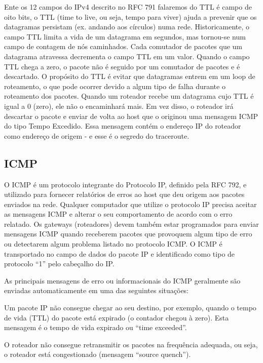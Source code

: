 \documentclass[article,12pt,oneside,a4paper,english,brazil,sumario=tradicional]{abntex2}
\begin{document}
Ente os 12 campos do IPv4 descrito no RFC 791 falaremos do TTL é campo de oito bits, o TTL (time to live, ou seja, tempo para viver) ajuda a prevenir que os datagramas persistam (ex. andando aos círculos) numa rede. Historicamente, o campo TTL limita a vida de um datagrama em segundos, mas tornou-se num campo de contagem de nós caminhados. Cada comutador de pacotes que um datagrama atravessa decrementa o campo TTL em um valor. Quando o campo TTL chega a zero, o pacote não é seguido por um comutador de pacotes e é descartado.
O propósito do TTL é evitar que datagramas entrem em um loop de roteamento, o que pode ocorrer devido a algum tipo de falha durante o roteamento dos pacotes. Quando um roteador recebe um datagrama cujo TTL é igual a 0 (zero), ele não o encaminhará mais. Em vez disso, o roteador irá descartar o pacote e enviar de volta ao host que o originou uma mensagem ICMP do tipo Tempo Excedido. Essa mensagem contém o endereço IP do roteador como endereço de origem - e esse é o segredo do traceroute.\cite{article2016}

\subsection{ICMP}

O ICMP é um protocolo integrante do Protocolo IP, definido pela RFC 792, e utilizado para fornecer relatórios de erros ao host que deu origem aos pacotes enviados na rede. Qualquer computador que utilize o protocolo IP precisa aceitar as mensagens ICMP e alterar o seu comportamento de acordo com o erro relatado. Os gateways (roteadores) devem também estar programados para enviar mensagens ICMP quando receberem pacotes que provoquem algum tipo de erro ou detectarem algum problema listado no protocolo ICMP. O ICMP é transportado no campo de dados do pacote IP e identificado como tipo de protocolo “1” pelo cabeçalho do IP.

As principais mensagens de erro ou informacionais do ICMP geralmente são enviadas automaticamente em uma das seguintes situações:

Um pacote IP não consegue chegar ao seu destino, por exemplo, quando o tempo de vida (TTL) do pacote está expirado (o contador chegou à zero). Esta mensagem é o tempo de vida expirado ou “time exceeded”.

O roteador não consegue retransmitir os pacotes na frequência adequada, ou seja, o roteador está congestionado (mensagem “source quench”).
\end{document}

